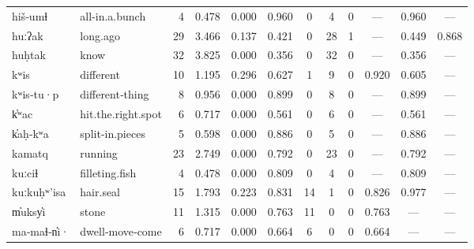 \begin{landscape}
\begin{longtable}[c]{ l l | r r c c | c c c | c c c }
  hiš‑umɬ            & all‑in.a.bunch            & 4   & 0.478                     & 0.000           & 0.960      & 0         & 4           & 0            & —         & 0.960       & —\\
  huːʔak             & long.ago                  & 29  & 3.466                     & 0.137           & 0.421      & 0         & 28          & 1            & —         & 0.449       & 0.868\\
  huḥtak             & know                      & 32  & 3.825                     & 0.000           & 0.356      & 0         & 32          & 0            & —         & 0.356       & —\\
  kʷis               & different                 & 10  & 1.195                     & 0.296           & 0.627      & 1         & 9           & 0            & 0.920     & 0.605       & —\\
  kʷis‑tu·p          & different‑thing           & 8   & 0.956                     & 0.000           & 0.899      & 0         & 8           & 0            & —         & 0.899       & —\\
  k̓ʷac               & hit.the.right.spot        & 6   & 0.717                     & 0.000           & 0.561      & 0         & 6           & 0            & —         & 0.561       & —\\
  k̓aḥ‑kʷa            & split‑in.pieces           & 5   & 0.598                     & 0.000           & 0.886      & 0         & 5           & 0            & —         & 0.886       & —\\
  kamatq             & running                   & 23  & 2.749                     & 0.000           & 0.792      & 0         & 23          & 0            & —         & 0.792       & —\\
  kuːciɬ             & filleting.fish            & 4   & 0.478                     & 0.000           & 0.809      & 0         & 4           & 0            & —         & 0.809       & —\\
  kuːkuḥʷ'isa        & hair.seal                 & 15  & 1.793                     & 0.223           & 0.831      & 14        & 1           & 0            & 0.826     & 0.977       & —\\
  m̓uksy̓i             & stone                     & 11  & 1.315                     & 0.000           & 0.763      & 11        & 0           & 0            & 0.763     & —           & —\\
  ma‑maɬ‑n̓i·         & dwell‑move‑come           & 6   & 0.717                     & 0.000           & 0.664      & 6         & 0           & 0            & 0.664     & —           & —\\

\end{longtable}
\end{landscape}
